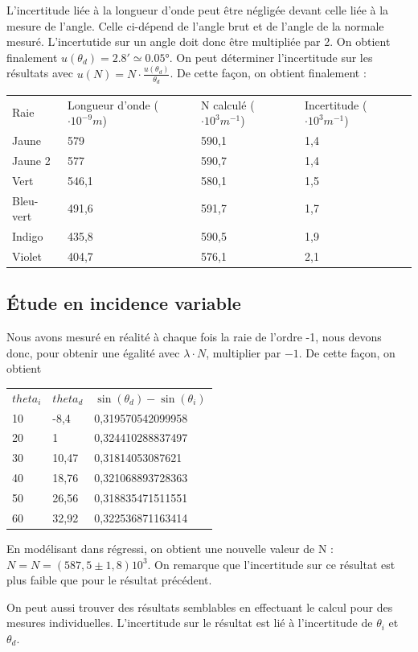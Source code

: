 \documentclass[a4paper,10pt,french]{scrartcl}
\begin{document}
L'incertitude liée à la longueur d'onde peut \^etre négligée devant celle liée à la mesure de l'angle. Celle ci-dépend de l'angle brut et de l'angle de la normale mesuré. L'incertutide sur un angle doit donc \^etre multipliée par 2. On obtient finalement \(u(\theta_d)= 2.8'\simeq 0.05°\). On peut déterminer l'incertitude sur les résultats avec \(u(N) = N\cdot\frac{u(\theta_d)}{\theta_d}\). De cette façon, on obtient finalement :
\begin{center}
\begin{tabular}{llll}
Raie & Longueur d’onde (\(\cdot 10^{-9}m\)) & N calculé (\(\cdot 10^{3}m^{-1}\)) & Incertitude (\(\cdot 10^{3}m^{-1}\))\\
Jaune & 579 & 590,1 & 1,4\\
Jaune 2 & 577 & 590,7 & 1,4\\
Vert & 546,1 & 580,1 & 1,5\\
Bleu-vert & 491,6 & 591,7 & 1,7\\
Indigo & 435,8 & 590,5 & 1,9\\
Violet & 404,7 & 576,1 & 2,1
\end{tabular}
\end{center}
\subsection{Étude en incidence variable}
Nous avons mesuré en réalité à chaque fois la raie de l'ordre -1, nous devons donc, pour obtenir une égalité avec \(\lambda \cdot N\), multiplier par \(-1\). De cette façon, on obtient
\begin{center}
\begin{tabular}{lll}
\(theta_i\) & \(theta_d\) & \(\sin(\theta_d)-\sin(\theta_i)\)\\
10 & -8,4 & 0,319570542099958\\
20 & 1 & 0,324410288837497\\
30 & 10,47 & 0,31814053087621\\
40 & 18,76 & 0,321068893728363\\
50 & 26,56 & 0,318835471511551\\
60 & 32,92 & 0,322536871163414
\end{tabular}
\end{center}
En modélisant dans régressi, on obtient une nouvelle valeur de N : \(N = N=(587,5 \pm1,8)10^{3} \). On remarque que l'incertitude sur ce résultat est plus faible que pour le résultat précédent.

On peut aussi trouver des résultats semblables en effectuant le calcul pour des mesures individuelles. L'incertitude sur le résultat est lié à l'incertitude de \(\theta_i\) et \(\theta_d\).
\end{document}
